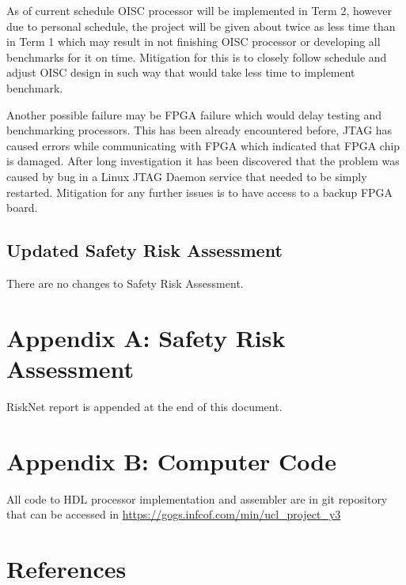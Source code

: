 \documentclass[a4paper,12pt]{article}
\begin{document}
\begin{multicols}{2}
As of current schedule OISC processor will be implemented in Term 2, however due to personal schedule, the project will be given about twice as less time than in Term 1 which may result in not finishing OISC processor or developing all benchmarks for it on time. Mitigation for this is to closely follow schedule and adjust OISC design in such way that would take less time to implement benchmark.

Another possible failure may be FPGA failure which would delay testing and benchmarking processors. This has been already encountered before, JTAG has caused errors while communicating with FPGA which indicated that FPGA chip is damaged. After long investigation it has been discovered that the problem was caused by bug in a Linux JTAG Daemon service that needed to be simply restarted. Mitigation for any further issues is to have access to a backup FPGA board.

\subsection{Updated Safety Risk Assessment}
There are no changes to Safety Risk Assessment.

\end{multicols}
\pagebreak

\section{Appendix A: Safety Risk Assessment}
RiskNet report is appended at the end of this document.

\section{Appendix B: Computer Code}
All code to HDL processor implementation and assembler are in git repository that can be accessed in \url{https://gogs.infcof.com/min/ucl_project_y3}

\section{References}
\printbibliography


\end{document}
